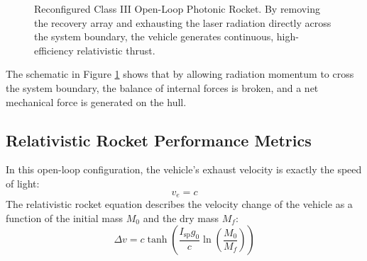 \documentclass[journal,10pt,twoside]{IEEEtran}
\begin{document}
\begin{figure}[htbp]
\centering
{}
\caption{Reconfigured Class III Open-Loop Photonic Rocket. By removing the recovery array and exhausting the laser radiation directly across the system boundary, the vehicle generates continuous, high-efficiency relativistic thrust.}
\label{fig:reconfigured_schematic}
\end{figure}

The schematic in Figure \ref{fig:reconfigured_schematic} shows that by allowing radiation momentum to cross the system boundary, the balance of internal forces is broken, and a net mechanical force is generated on the hull.

\subsection{Relativistic Rocket Performance Metrics}
In this open-loop configuration, the vehicle's exhaust velocity is exactly the speed of light:
\begin{equation}
v_e = c
\label{eq:exhaust_velocity}
\end{equation}
The relativistic rocket equation describes the velocity change of the vehicle as a function of the initial mass $M_0$ and the dry mass $M_f$:
\begin{equation}
\Delta v = c \tanh\left( \frac{I_{\text{sp}} g_0}{c} \ln \left( \frac{M_0}{M_f} \right) \right)
\label{eq:relativistic_rocket_equation}
\end{equation}
\end{document}
